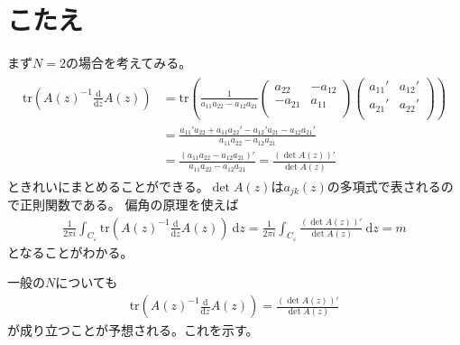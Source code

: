 \documentclass{jsarticle}
\def\diff{\textrm{d}}
\begin{document}
\section*{こたえ}
まず$N=2$の場合を考えてみる。
\begin{align*}
\begin{aligned}
\mathrm{tr}\left(A(z)^{-1}\frac{\diff}{\diff z}A(z)\right)
&=\mathrm{tr}\left(\frac{1}{a_{11}a_{22}-a_{12}a_{21}}
\begin{pmatrix}
    a_{22} & -a_{12} \\
    -a_{21} & a_{11} \\
\end{pmatrix}
\begin{pmatrix}
    a_{11}' & a_{12}' \\
    a_{21}' & a_{22}' \\
\end{pmatrix}
\right)\\
&=\frac{a_{11}'a_{22}+a_{11}a_{22}'-a_{12}'a_{21}-a_{12}a_{21}'}{a_{11}a_{22}-a_{12}a_{21}}\\
&=\frac{\left(a_{11}a_{22}-a_{12}a_{21}\right)'}{a_{11}a_{22}-a_{12}a_{21}}
=\frac{\left(\det A(z)\right)'}{\det A(z)}
\end{aligned}
\end{align*}
ときれいにまとめることができる。$\det A(z)$は$a_{jk}(z)$の多項式で表されるので正則関数である。
偏角の原理を使えば
\begin{align}
\frac{1}{2\pi i}\int_{C_{\varepsilon}}\mathrm{tr}\left(A(z)^{-1}\frac{\diff}{\diff z}A(z)\right)~\diff z=\frac{1}{2\pi i}\int_{C_{\varepsilon}}\frac{\left(\det A(z)\right)'}{\det A(z)}~\diff z=m
\end{align}
となることがわかる。

一般の$N$についても
\begin{align}
\mathrm{tr}\left(A(z)^{-1}\frac{\diff}{\diff z}A(z)\right)=\frac{\left(\det A(z)\right)'}{\det A(z)}
\end{align}
が成り立つことが予想される。これを示す。
\end{document}

